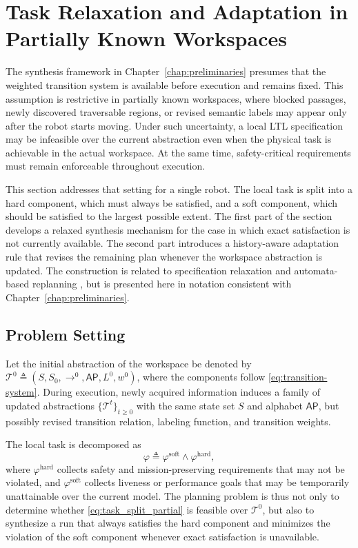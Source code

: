 
\section{Task Relaxation and Adaptation in Partially Known Workspaces}
\label{sec:task_relaxation_adaptation}

The synthesis framework in Chapter~\ref{chap:preliminaries} presumes that the
weighted transition system is available before execution and remains fixed.
This assumption is restrictive in partially known workspaces, where blocked
passages, newly discovered traversable regions, or revised semantic labels may
appear only after the robot starts moving. Under such uncertainty, a local LTL
specification may be infeasible over the current abstraction even when the
physical task is achievable in the actual workspace. At the same time,
safety-critical requirements must remain enforceable throughout execution.

This section addresses that setting for a single robot. The local task is split
into a hard component, which must always be satisfied, and a soft component,
which should be satisfied to the largest possible extent. The first part of the
section develops a relaxed synthesis mechanism for the case in which exact
satisfaction is not currently available. The second part introduces a
history-aware adaptation rule that revises the remaining plan whenever the
workspace abstraction is updated. The construction is related to specification
relaxation and automata-based replanning
\cite{kim2012approximate,guo2013revising,livingston2012backtracking}, but is
presented here in notation consistent with
Chapter~\ref{chap:preliminaries}.

\subsection{Problem Setting}
\label{subsec:problem_setting_relaxation}

Let the initial abstraction of the workspace be denoted by
$\mathcal{T}^{0} \triangleq
(S,S_{0},\rightarrow^{0},\mathsf{AP},L^{0},w^{0})$, where the components
follow \eqref{eq:transition-system}. During execution, newly acquired
information induces a family of updated abstractions
$\{\mathcal{T}^{t}\}_{t\geq 0}$ with the same state set $S$ and alphabet
$\mathsf{AP}$, but possibly revised transition relation, labeling function,
and transition weights.

The local task is decomposed as
\begin{equation}
\varphi \triangleq
\varphi^{\mathrm{soft}} \wedge \varphi^{\mathrm{hard}},
\label{eq:task_split_partial}
\end{equation}
where $\varphi^{\mathrm{hard}}$ collects safety and mission-preserving
requirements that may not be violated, and
$\varphi^{\mathrm{soft}}$ collects liveness or performance goals that may be
temporarily unattainable over the current model. The planning problem is thus
not only to determine whether \eqref{eq:task_split_partial} is feasible over
$\mathcal{T}^{0}$, but also to synthesize a run that always satisfies the hard
component and minimizes the violation of the soft component whenever exact
satisfaction is unavailable.

